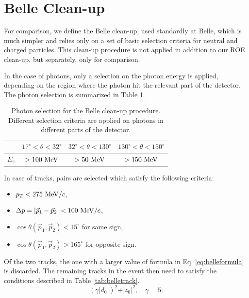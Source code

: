 \section{Belle Clean-up}

For comparison, we define the Belle clean-up, used standardly at Belle, which is much simpler and relies only on a set of basic selection criteria for neutral and charged particles. This clean-up procedure is not applied in addition to our ROE clean-up, but separately, only for comparison. 

In the case of photons, only a selection on the photon energy is applied, depending on the region where the photon hit the relevant part of the detector. The photon selection is summarized in Table \ref{tab:bellegamma}.

\begin{table}[H]
	\centering
	\begin{tabular}{c|c|c|c}
		& $17^\circ < \theta < 32^\circ$ & $32^\circ < \theta < 130^\circ$ & $130^\circ < \theta < 150^\circ$ \\
		\toprule
		$E_\gamma$ & $> 100\mathrm{~MeV}$  & $> 50\mathrm{~MeV}$ & $> 150\mathrm{~MeV}$  \\
		\bottomrule
	\end{tabular}
	\captionsetup{width=.8\linewidth}
	\caption{Photon selection for the Belle clean-up procedure. Different selection criteria are applied on photons in different parts of the detector.}
	\label{tab:bellegamma}
\end{table}

In case of tracks, pairs are selected which satisfy the following criteria:
\begin{itemize}
	\item $p_T < 275\mathrm{~MeV}/c$,
	\item $\Delta p = \vert \vec{p}_1 - \vec{p}_2\vert  < 100\mathrm{~MeV}/c$,
	\item $\cos \theta (\vec{p}_1,\vec{p}_2) < 15^\circ$ for same sign,
	\item $\cos\theta(\vec{p}_1,\vec{p}_2) > 165^\circ$ for opposite sign.
\end{itemize}

Of the two tracks, the one with a larger value of formula in Eq. \ref{eq:belleformula} is discarded. The remaining tracks in the event then need to satisfy the conditions described in Table \ref{tab:belletrack}.
\begin{equation}
\label{eq:belleformula}
\left(\gamma\vert d_0 \vert \right)^2 + \vert z_0 \vert^2, \quad \gamma = 5.
\end{equation}

